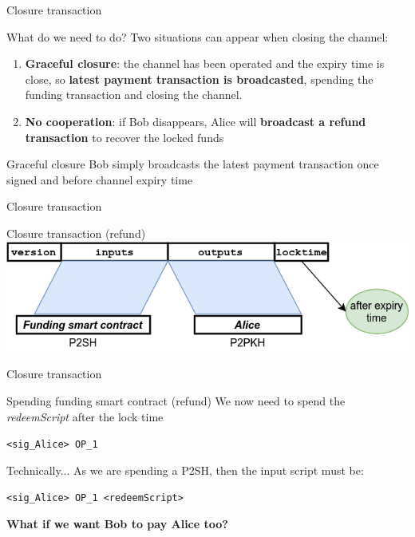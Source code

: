 \documentclass{beamer}
\begin{document}
\begin{frame}{Closure transaction}
 \begin{block}{What do we need to do?}
  Two situations can appear when closing the channel:
  \begin{enumerate}[<+->]
   \item \textbf{Graceful closure}: the channel has been operated and the expiry time is close, so \textbf{latest payment transaction is broadcasted}, spending the funding transaction and closing the channel.
   \item \textbf{No cooperation}: if Bob disappears, Alice will \textbf{broadcast a refund transaction} to recover the locked funds
  \end{enumerate}
 \end{block}
 \pause
 \begin{exampleblock}{Graceful closure}
  Bob simply broadcasts the latest payment transaction once signed and before channel expiry time
 \end{exampleblock}
\end{frame}
\begin{frame}{Closure transaction}
 \begin{exampleblock}{Closure transaction (refund)}
  \includegraphics[width=\textwidth, height=0.8\textheight, keepaspectratio]{img/unidir_tx_refund.png}
 \end{exampleblock}
\end{frame}
\begin{frame}{Closure transaction}
 \begin{exampleblock}{Spending funding smart contract (refund)}
  We now need to spend the \textit{redeemScript} after the lock time
  \pause
  \begin{center}
   \texttt{<sig\_Alice> OP\_1}
  \end{center}
 \end{exampleblock}
 \pause
 \begin{exampleblock}{Technically...}
  As we are spending a P2SH, then the input script must be:\
  \begin{center}
   \texttt{<sig\_Alice> OP\_1 <redeemScript>}
  \end{center}

 \end{exampleblock}
\end{frame}
\begin{frame}
 \begin{center}
  \textbf{What if we want Bob to pay Alice too?}
 \end{center}
\end{frame}
\end{document}
